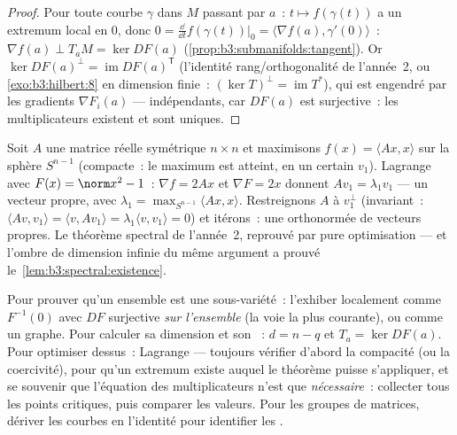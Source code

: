 \begin{proof}
Pour toute courbe $\gamma$ dans $M$ passant par $a$~: $t
\mapsto f(\gamma(t))$ a un extremum local en $0$, donc $0 =
\frac{\dd}{\dd t}f(\gamma(t))\big|_0 = \langle\nabla f(a),
\gamma'(0)\rangle$~: $\nabla f(a) \perp T_aM = \ker DF(a)$
(\cref{prop:b3:submanifolds:tangent}). Or $\ker DF(a)^\perp
= \operatorname{im}DF(a)^{\mathsf T}$ (l'identité
rang/orthogonalité de l'année~2, ou \cref{exo:b3:hilbert:8}
en dimension finie~: $(\ker T)^\perp = \operatorname{im}T^*$),
qui est engendré par les gradients $\nabla F_i(a)$ ---
indépendants, car $DF(a)$ est surjective~: les multiplicateurs
existent et sont uniques.
\end{proof}

\begin{example}
\label{ex:b3:submanifolds:rayleigh}
Soit $A$ une matrice réelle symétrique $n\times n$ et
maximisons $f(x) = \langle Ax, x\rangle$ sur la sphère
$S^{n-1}$ (compacte~: le maximum est atteint, en un certain
$v_1$). Lagrange avec $F(x) = \norm x^2 - 1$~: $\nabla f =
2Ax$ et $\nabla F = 2x$ donnent $Av_1 = \lambda_1v_1$ --- un
vecteur propre, avec $\lambda_1 = \max_{S^{n-1}}\langle Ax,
x\rangle$. Restreignons $A$ à $v_1^\perp$ (invariant~:
$\langle Av, v_1\rangle = \langle v, Av_1\rangle =
\lambda_1\langle v, v_1\rangle = 0$) et itérons~: une 
orthonormée de vecteurs propres. Le théorème spectral de
l'année~2, reprouvé par pure optimisation --- et l'ombre de
dimension infinie du même argument a prouvé
le~\cref{lem:b3:spectral:existence}.
\end{example}

\begin{method}\label{met:b3:submanifolds:method}
Pour prouver qu'un ensemble est une sous-variété~: l'exhiber
localement comme $F^{-1}(0)$ avec $DF$ surjective \emph{sur
l'ensemble} (la voie la plus courante), ou comme un graphe.
Pour calculer sa dimension et son ~: $d = n - q$
et $T_a = \ker DF(a)$. Pour optimiser dessus~: Lagrange ---
toujours vérifier d'abord la compacité (ou la coercivité),
pour qu'un extremum existe auquel le théorème puisse
s'appliquer, et se souvenir que l'équation des multiplicateurs
n'est que \emph{nécessaire}~: collecter tous les points
critiques, puis comparer les valeurs. Pour les groupes de
matrices, dériver les courbes en l'identité pour identifier
les .
\end{method}

